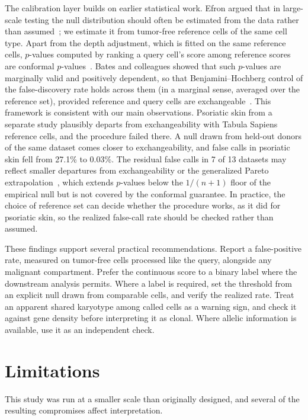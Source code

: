 \documentclass[11pt,letterpaper]{article}
\begin{document}
The calibration layer builds on earlier statistical work. Efron argued that in large-scale testing the null distribution should often be estimated from the data rather than assumed~\cite{efron2004}; we estimate it from tumor-free reference cells of the same cell type. Apart from the depth adjustment, which is fitted on the same reference cells, $p$-values computed by ranking a query cell's score among reference scores are conformal $p$-values~\cite{angelopoulos2023}. Bates and colleagues showed that such $p$-values are marginally valid and positively dependent, so that Benjamini--Hochberg control of the false-discovery rate holds across them (in a marginal sense, averaged over the reference set), provided reference and query cells are exchangeable~\cite{bates2023}. This framework is consistent with our main observations. Psoriatic skin from a separate study plausibly departs from exchangeability with Tabula Sapiens reference cells, and the procedure failed there. A null drawn from held-out donors of the same dataset comes closer to exchangeability, and false calls in psoriatic skin fell from 27.1\% to 0.03\%. The residual false calls in 7 of 13 datasets may reflect smaller departures from exchangeability or the generalized Pareto extrapolation~\cite{knijnenburg2009}, which extends $p$-values below the $1/(n+1)$ floor of the empirical null but is not covered by the conformal guarantee. In practice, the choice of reference set can decide whether the procedure works, as it did for psoriatic skin, so the realized false-call rate should be checked rather than assumed.

These findings support several practical recommendations. Report a false-positive rate, measured on tumor-free cells processed like the query, alongside any malignant compartment. Prefer the continuous score to a binary label where the downstream analysis permits. Where a label is required, set the threshold from an explicit null drawn from comparable cells, and verify the realized rate. Treat an apparent shared karyotype among called cells as a warning sign, and check it against gene density before interpreting it as clonal. Where allelic information is available, use it as an independent check.

\section{Limitations}

This study was run at a smaller scale than originally designed, and several of the resulting compromises affect interpretation.
\end{document}
